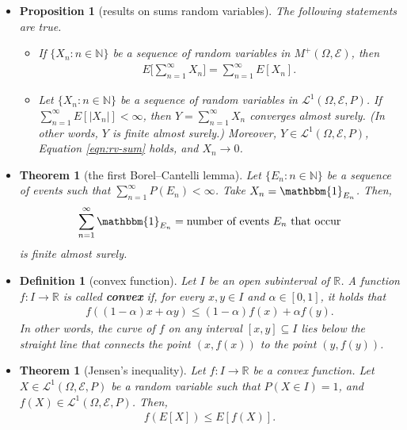 \documentclass[10pt]{article}
\newtheorem{theorem}[lemma]{Theorem}
\newtheorem{definition}[lemma]{Definition}
\newtheorem{proposition}[lemma]{Proposition}
\numberwithin{lemma}{section}
\newcommand{\mcal}[1]{\mathcal{#1}}
\newcommand{\Real}{\mathbb{R}}
\newcommand{\Nat}{\mathbb{N}}
\newcommand{\one}{\mathbbm{1}}
\begin{document}
\begin{itemize}
  \item \begin{proposition}[results on sums random variables] The following statements are true.
    \begin{itemize}
      \item If $\{ X_n : n \in \Nat \}$ be a sequence of random variables in $M^+(\Omega,\mcal{E})$, then
      \begin{align}
        E\bigg[ \sum_{n=1}^\infty X_n \bigg] = \sum_{n=1}^\infty E[X_n]. \label{eqn:rv-sum}
      \end{align}

      \item Let $\{X_n: n \in \Nat\}$ be a sequence of random variables in $\mcal{L}^1(\Omega,\mcal{E},P)$. If $\sum_{n=1}^\infty E[|X_n|] < \infty$, then $Y = \sum_{n=1}^\infty X_n$ converges almost surely. (In other words, $Y$ is finite almost surely.) Moreover, $Y \in \mcal{L}^1(\Omega,\mcal{E},P)$, Equation \eqref{eqn:rv-sum} holds, and $X_n \rightarrow 0$. 
    \end{itemize}
  \end{proposition}

  \item \begin{theorem}[the first Borel--Cantelli lemma]
    Let $\{ E_n : n \in \Nat \}$ be a sequence of events such that $\sum_{n=1}^\infty P(E_n) < \infty$. Take $X_n = \one_{E_n}$. Then,
    \begin{align*}
      \sum_{n=1}^\infty \one_{E_n} = \mbox{number of events $E_n$ that occur}
    \end{align*}
    is finite almost surely.
  \end{theorem}

  \item \begin{definition}[convex function]
    Let $I$ be an open subinterval of $\Real$. A function $f: I \rightarrow \Real$ is called {\bf convex} if, for every $x,y \in I$ and $\alpha \in [0,1]$, it holds that
    \begin{align*}
      f((1-\alpha)x + \alpha y) \leq (1-\alpha)f(x) + \alpha f(y).
    \end{align*}
    In other words, the curve of $f$ on any interval $[x,y] \subseteq I$ lies below the straight line that connects the point $(x,f(x))$ to the point $(y,f(y))$.
  \end{definition}

  \item \begin{theorem}[Jensen's inequality]
    Let $f: I \rightarrow \Real$ be a convex function. Let $X \in \mcal{L}^1(\Omega,\mcal{E},P)$ be a random variable such that $P(X \in I) = 1$, and $f(X) \in \mcal{L}^1(\Omega, \mcal{E}, P)$. Then,
    \begin{align*}
      f(E[X]) \leq E[f(X)].
    \end{align*}
  \end{theorem}
\end{itemize}
\end{document}
